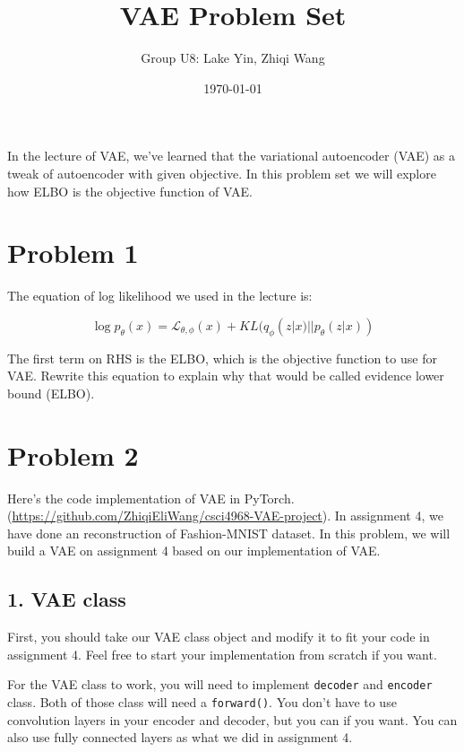 \documentclass{article}
\begin{document}
\title{\vspace{-3cm}VAE Problem Set}
\author{Group U8: Lake Yin, Zhiqi Wang}
\date{\today}
\maketitle

In the lecture of VAE, we've learned that the variational autoencoder (VAE) as a tweak of autoencoder with given objective. In this problem set we will explore how ELBO is the objective function of VAE.



\section*{Problem 1}

The equation of log likelihood we used in the lecture is:

 $$\log p_\theta (x) = \mathcal{L}_{\theta, \phi}(x) + KL(q_\phi(z|x)||p_\theta(z|x))$$

The first term on RHS is the ELBO, which is the objective function to use for VAE. Rewrite this equation to explain why that would be called evidence lower bound (ELBO).


\section*{Problem 2}

Here's the code implementation of VAE in PyTorch. (\href{https://github.com/ZhiqiEliWang/csci4968-VAE-project}{https://github.com/ZhiqiEliWang/csci4968-VAE-project}). In assignment 4, we have done an reconstruction of Fashion-MNIST dataset. In this problem, we will build a VAE on assignment 4 based on our implementation of VAE.


\subsection*{1. VAE class}
First, you should take our VAE class object and modify it to fit your code in assignment 4. Feel free to start your implementation from scratch if you want. 

For the VAE class to work, you will need to implement \texttt{decoder} and \texttt{encoder} class. Both of those class will need a \texttt{forward()}. You don't have to use convolution layers in your encoder and decoder, but you can if you want. You can also use fully connected layers as what we did in assignment 4.
\end{document}
